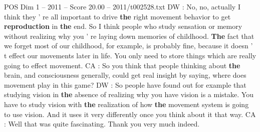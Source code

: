 \begin{textsample}{POS Dim 1 – 2011 – Score 20.00 – 2011/t002528.txt}
DW : No, no, actually I think they ' re all important to drive \textbf{the} right movement behavior to get \textbf{reproduction} in \textbf{the} end.
So I think people who study sensation or memory without realizing why you ' re laying down memories of childhood. \textbf{The} fact that we forget most of our childhood, for example, is probably fine, because it doesn ' t effect our movements later in life.
You only need to store things which are really going to effect movement.
CA : So you think that people thinking about \textbf{the} brain, and consciousness generally, could get real insight by saying, where does movement play in this game?
DW : So people have found out for example that studying vision in \textbf{the} absence of realizing why you have vision is a mistake.
You have to study vision with \textbf{the} realization of how \textbf{the} movement system is going to use vision.
And it uses it very differently once you think about it that way.
CA : Well that was quite fascinating.
Thank you very much indeed.

\end{textsample}
